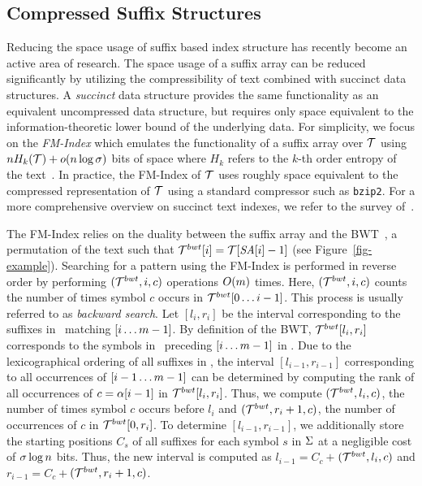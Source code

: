 \subsection{Compressed Suffix Structures}
\label{sec-css}

Reducing the space usage of suffix based index structure has recently become an 
active area of research. The space usage of a suffix array can be reduced 
significantly by utilizing the compressibility of text combined 
with succinct data structures. A {\it succinct} data structure provides the
same functionality as an equivalent uncompressed data structure, but requires
only space equivalent to the information-theoretic lower bound of the underlying
data. For simplicity, we focus on the {\it FM-Index} which emulates the
functionality of a suffix array over $\mathcal{T}$ using $n H_k(\mathcal{T})+o(n \log \sigma)$
bits of space where $H_k$ refers to the $k$-th order entropy of the text~\cite{fmmn-talg07}.
In practice, the FM-Index of $\mathcal{T}$ uses roughly space equivalent to
the compressed representation of $\mathcal{T}$ using a standard compressor such as {\tt bzip2}.
For a more comprehensive overview on succinct text indexes, we refer to the
survey of~.

The FM-Index relies on the duality between the suffix array and the BWT~\cite{bw-dec94}, 
a permutation of the text such that $\mathcal{T}^{bwt}[i] = \mathcal{T}[\mbox{\emph{SA}}[i]-1]$ (see Figure~\ref{fig-example}). Searching for
a pattern using the FM-Index is performed in reverse order by performing  
{\rankop$(\mathcal{T}^{bwt},i,c)$} operations $O(m)$ times. Here, {\rankop$(\mathcal{T}^{bwt},i,c)$}  
counts the number of times symbol $c$ occurs in $\mathcal{T}^{bwt}[0\ldots i-1]$. 
This process is usually referred to as {\it backward search}. Let \SA$[l_i,r_i]$ be
the interval corresponding to the suffixes in \col\ matching \pattern$[i\ldots m-1]$.
By definition of the BWT, $\mathcal{T}^{bwt}[l_i,r_i]$ corresponds to the symbols in \col\
preceding \pattern$[i\ldots m-1]$ in \col. Due to the lexicographical ordering
of all suffixes in \SA, the interval \SA$[l_{i-1},r_{i-1}]$ corresponding to all
occurrences of \pattern$[i-1\ldots m-1]$ can be determined by computing the rank
of all occurrences of $c=\alpha[i-1]$ in $\mathcal{T}^{bwt}[l_i,r_i]$. Thus, we compute
\rankop$(\mathcal{T}^{bwt},l_i,c)$, the number of times symbol $c$ occurs before
$l_i$ and \rankop$(\mathcal{T}^{bwt},r_i+1,c)$, the number of occurrences of $c$ in $\mathcal{T}^{bwt}[0,r_i]$.
To determine \SA$[l_{i-1},r_{i-1}]$, we additionally store the starting positions $C_{s}$
of all suffixes for each symbol $s$ in $\Sigma$ at a negligible cost 
of $\sigma \log n$ bits.
Thus, the new interval is computed as $l_{i-1} = C_c + $\rankop$(\mathcal{T}^{bwt},l_i,c)$ 
and $r_{i-1} = C_c + $\rankop$(\mathcal{T}^{bwt},r_i+1,c)$.


